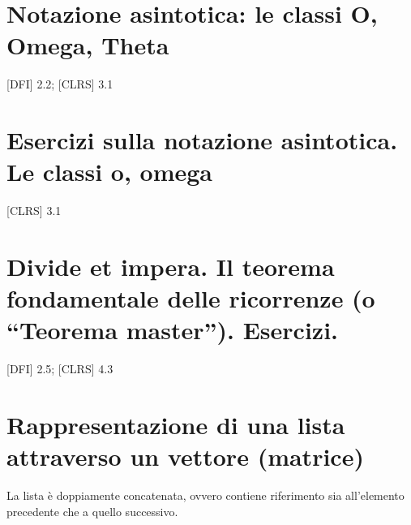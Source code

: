 \documentclass{article}
\begin{document}
\section{\texorpdfstring{{}}{}}\label{h.t0xc4p18h6wu}

\hypertarget{h.jkxlloc1lefg}{\section{\texorpdfstring{{Notazione
asintotica: le classi O, Omega, Theta
}}{Notazione asintotica: le classi O, Omega, Theta }}\label{h.jkxlloc1lefg}}

{{[}DFI{]} 2.2; {[}CLRS{]} 3.1}

{}

{}

{}

\hypertarget{h.tn5j57miv2l8}{\section{\texorpdfstring{{Esercizi sulla
notazione asintotica. Le classi o,
omega}}{Esercizi sulla notazione asintotica. Le classi o, omega}}\label{h.tn5j57miv2l8}}

{{[}CLRS{]} 3.1}

{}

{}

\hypertarget{h.qp9ilz1tito1}{\section{\texorpdfstring{{Divide et impera.
Il teorema fondamentale delle ricorrenze (o ``Teorema master'').
Esercizi.}}{Divide et impera. Il teorema fondamentale delle ricorrenze (o Teorema master). Esercizi.}}\label{h.qp9ilz1tito1}}

{{[}DFI{]} 2.5; {[}CLRS{]} 4.3}

{}

{}

{}

\hypertarget{h.a5tr7osf4zwh}{\section{\texorpdfstring{{Rappresentazione
di una lista attraverso un vettore
(matrice)}}{Rappresentazione di una lista attraverso un vettore (matrice)}}\label{h.a5tr7osf4zwh}}

{}

{La lista è doppiamente concatenata, ovvero contiene riferimento sia
all'elemento precedente che a quello successivo.}
\end{document}
